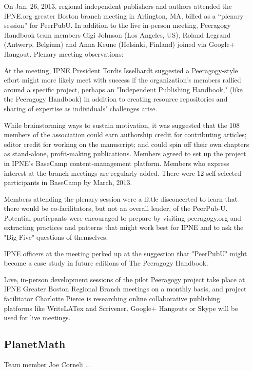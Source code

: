 \documentclass{acm_proc_article-sp}
\begin{document}
On Jan. 26, 2013, regional independent publishers and authors attended
the IPNE.org greater Boston branch meeting in Arlington, MA, billed as
a ``plenary session'' for PeerPubU. In addition to the live in-person
meeting, Peeragogy Handbook team members Gigi Johnson (Los Angeles,
US), Roland Legrand (Antwerp, Belgium) and Anna Keune (Helsinki,
Finland) joined via Google+ Hangout.  Plenary meeting observations:

At the meeting, IPNE President Tordis Isselhardt suggested a Peeragogy-style effort might more likely meet with success if the organization's members rallied around a specific project, perhaps an "Independent Publishing Handbook," (like the Peeragogy Handbook) in addition to creating resource repositories and sharing of expertise as individuals' challenges arise.

While brainstorming ways to sustain motivation, it was suggested that the 108 members of the association could earn authorship credit for contributing articles; editor credit for working on the manuscript; and could spin off their own chapters as stand-alone, profit-making publications. Members agreed to set up the project in IPNE's BaseCamp content-management platform. Members who express interest at the branch meetings are regularly added. There were 12 self-selected participants in BaseCamp by March, 2013.

Members attending the plenary session were a little disconcerted to learn that there would be co-facilitators, but not an overall leader, of the PeerPub-U. Potential particpants were encouraged to prepare by visiting peeragogy.org and
extracting practices and patterns that might work best for IPNE and to ask the "Big Five" questions of themselves.

IPNE officers at the meeting perked up at the suggestion that "PeerPubU" might become a case study in future editions of The Peeragogy Handbook.

Live, in-person development sessions of the pilot Peeragogy project take place at IPNE Greater Boston Regional Branch meetings on a monthly basis, and project facilitator Charlotte Pierce is researching online collaborative publishing platforms like WriteLATex and Scrivener. Google+ Hangouts or Skype will be used for live meetings.

\subsection{PlanetMath}

Team member Joe Corneli ...
\end{document}
